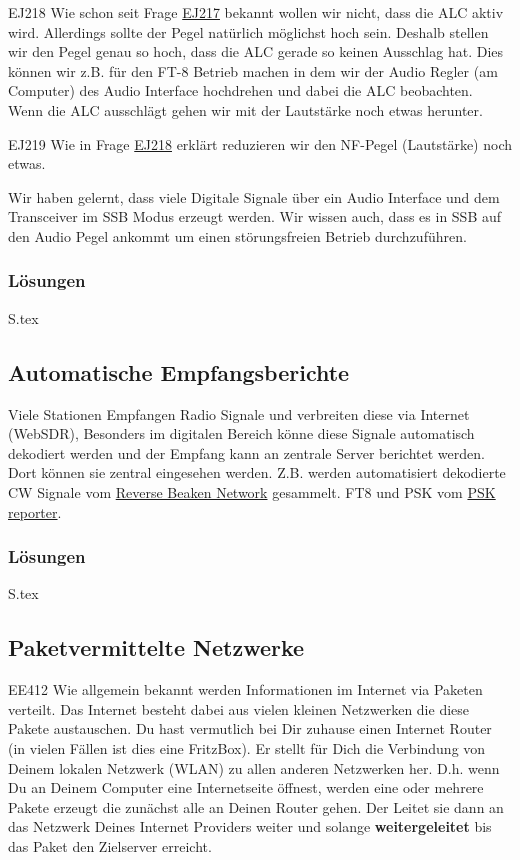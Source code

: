 \documentclass[10pt,a4paper,ngerman]{article}
\theoremstyle{definition}
\theoremstyle{plain}
\theoremstyle{mytheorem}
\newcommand{\qref}[1]{\hyperref[#1]{#1}}
\theoremstyle{definition}
\newenvironment{ohmchapter}{}
{
  \subsubsection*{Lösungen}
  S\arabic{subsection}.tex}
}
\begin{document}
\begin{sol}{EJ218}
Wie schon seit Frage \qref{EJ217} bekannt wollen wir nicht, dass die ALC aktiv wird. Allerdings sollte der Pegel natürlich möglichst hoch sein. Deshalb stellen wir den Pegel genau so hoch, dass die ALC gerade so keinen Ausschlag hat. Dies können wir z.B. für den FT-8 Betrieb machen in dem wir der Audio Regler (am Computer) des Audio Interface hochdrehen und dabei die ALC beobachten. Wenn die ALC ausschlägt gehen wir mit der Lautstärke noch etwas herunter. 
\end{sol}


\begin{sol}{EJ219}
Wie in Frage \qref{EJ218} erklärt reduzieren wir den NF-Pegel (Lautstärke) noch etwas.
\end{sol}

\begin{ohmchapter}
Wir haben gelernt, dass viele Digitale Signale über ein Audio Interface und dem Transceiver im SSB Modus erzeugt werden. Wir wissen auch, dass es in SSB auf den Audio Pegel ankommt um einen störungsfreien Betrieb durchzuführen.
\end{ohmchapter}


\subsection{Automatische Empfangsberichte}
Viele Stationen Empfangen Radio Signale und verbreiten diese via Internet (WebSDR),
Besonders im digitalen Bereich könne diese Signale automatisch dekodiert werden und der Empfang kann an zentrale Server berichtet werden. Dort können sie zentral eingesehen werden.
Z.B. werden automatisiert dekodierte CW Signale vom \href{https://www.reversebeacon.net/}{Reverse Beaken Network} gesammelt.
FT8 und PSK vom \href{https://pskreporter.info}{PSK reporter}.

\begin{ohmchapter}
\end{ohmchapter}



\subsection{Paketvermittelte Netzwerke}


\begin{sol}{EE412}
Wie allgemein bekannt werden Informationen im Internet via Paketen verteilt.
Das Internet besteht dabei aus vielen kleinen Netzwerken die diese Pakete austauschen. Du hast vermutlich bei Dir zuhause einen Internet Router (in vielen Fällen ist dies eine FritzBox). Er stellt für Dich die Verbindung von Deinem lokalen Netzwerk (WLAN) zu allen anderen Netzwerken her. D.h. wenn Du an Deinem Computer eine Internetseite öffnest, werden eine oder mehrere Pakete erzeugt die zunächst alle an Deinen Router gehen. Der Leitet sie dann an das Netzwerk Deines Internet Providers weiter und solange \textbf{weitergeleitet} bis das Paket den Zielserver erreicht.
\end{sol}
\end{document}
